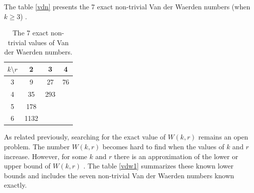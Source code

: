 
The table \eqref{vdn} presents the 7 exact non-trivial Van der Waerden numbers  (when $k\geq 3$) \citep{dransfield2004}.

\begin{table}[h]

\begin{center}
\begin{tabular}{|c|c|c|c|}
\hline 
$k \setminus r$ & 2 & 3 & 4  \\ 
\hline 
3 & 9 & 27 & 76  \\ 
\hline 
4 & 35 & 293 &   \\ 
\hline 
5 & 178 &  &   \\ 
\hline 
6 & 1132 &  &   \\ 
\hline 

\end{tabular}
\end{center}
\caption{The 7 exact non-trivial values of Van der Waerden numbers.} \label{vdn}
\end{table} 

As related previously, searching for the exact value of $W(k,r)$ remains an open  problem.
 The number $W(k,r)$ becomes hard to find when the values of $k$ and $r$ increase. However, for some $k$ and $r$ there is an approximation of the lower or upper bound of $W(k,r)$ \citep{stevens1978computer, herwig2007new, beeler1979some, dransfield2004, brown2008bounds, rabung2012, kouril2008van}. The table \eqref{vdw1} summarizes these known lower bounds and includes the seven non-trivial Van der Waerden numbers known exactly.

